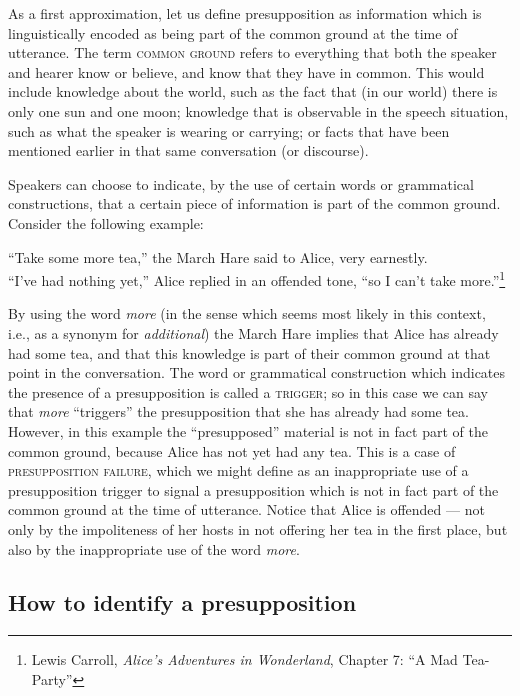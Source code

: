 As a first approximation, let us define presupposition as information which is linguistically encoded as being part of the common ground at the time of utterance. The term \textsc{common ground} refers to everything that both the speaker and hearer know or believe, and know that they have in common. This would include knowledge about the world, such as the fact that (in our world) there is only one sun and one moon; knowledge that is observable in the speech situation, such as what the speaker is wearing or carrying; or facts that have been mentioned earlier in that same conversation (or discourse).



Speakers can choose to indicate, by the use of certain words or grammatical constructions, that a certain piece of information is part of the common ground. Consider the following example:


\ea \label{ex:3.10}
“Take some more tea,” the March Hare said to Alice, very earnestly.\\
“I’ve had nothing yet,” Alice replied in an offended tone, “so I can’t take more.”\footnote{Lewis Carroll, \textit{Alice’s Adventures in Wonderland}, Chapter 7: “A Mad Tea-Party”}
\z


By using the word \textit{more} (in the sense which seems most likely in this context, i.e., as a synonym for \textit{additional}) the March Hare implies that Alice has already had some tea, and that this knowledge is part of their common ground at that point in the conversation. The word or grammatical construction which indicates the presence of a presupposition is called a \textsc{trigger}; so in this case we can say that \textit{more} “triggers” the presupposition that she has already had some tea. However, in this example the “presupposed” material is not in fact part of the common ground, because Alice has not yet had any tea. This is a case of \textsc{presupposition failure}, which we might define as an inappropriate use of a presupposition trigger to signal a presupposition which is not in fact part of the common ground at the time of utterance. Notice that Alice is offended — not only by the impoliteness of her hosts in not offering her tea in the first place, but also by the inappropriate use of the word \textit{more}.


\subsection{How to identify a presupposition}\label{sec:3.4.1}
\largerpage

